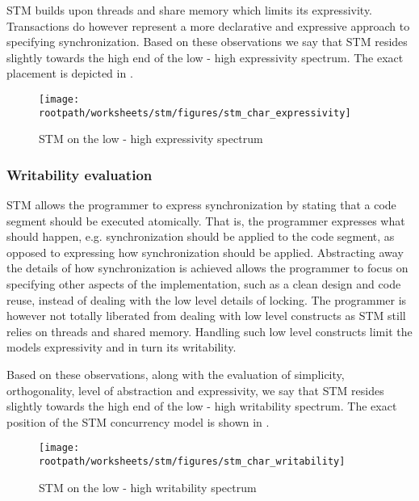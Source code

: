 \ac{STM} builds upon threads and share memory which limits its expressivity. Transactions do however represent a more declarative and expressive approach to specifying synchronization. Based on these observations we say that \ac{STM} resides slightly towards the high end of the low - high expressivity spectrum. The exact placement is depicted in .

\begin{figure}[htbp]
\centering
 \texttt{[image: \\rootpath/worksheets/stm/figures/stm\_char\_expressivity]} 
 \caption{\ac{STM} on the low - high expressivity spectrum}
\label{fig:char_stm_expressivity}
\end{figure}

\subsubsection{Writability evaluation}
\ac{STM} allows the programmer to express synchronization by stating that a code segment should be executed atomically. That is, the programmer expresses what should happen, e.g. synchronization should be applied to the code segment, as opposed to expressing how synchronization should be applied. Abstracting away the details of how synchronization is achieved allows the programmer to focus on specifying other aspects of the implementation, such as a clean design and code reuse, instead of dealing with the low level details of locking. The programmer is however not totally liberated from dealing with low level constructs as \ac{STM} still relies on threads and shared memory. Handling such low level constructs limit the models expressivity and in turn its writability.

Based on these observations, along with the evaluation of simplicity, orthogonality, level of abstraction and expressivity, we say that \ac{STM} resides slightly towards the high end of the low - high writability spectrum. The exact position of the \ac{STM} concurrency model is shown in .

\begin{figure}[htbp]
\centering
 \texttt{[image: \\rootpath/worksheets/stm/figures/stm\_char\_writability]} 
 \caption{\ac{STM} on the low - high writability spectrum}
\label{fig:char_stm_writability}
\end{figure}

\worksheetend
